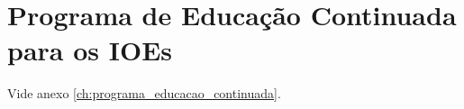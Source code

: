 \chapter{Programa de Educação Continuada para os IOEs}
Vide anexo \ref{ch:programa_educacao_continuada}.